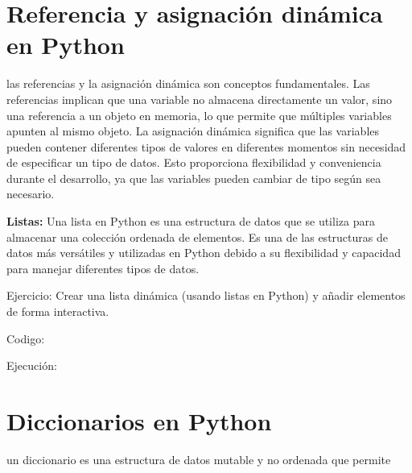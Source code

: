 \documentclass[a4paper]{article}
\begin{document}
\section{Referencia y asignación dinámica en Python}
{
las referencias y la asignación dinámica son conceptos fundamentales. Las referencias implican que una variable no
almacena directamente un valor, sino una referencia a un objeto en memoria, lo que permite que múltiples variables
apunten al mismo objeto. La asignación dinámica significa que las variables pueden contener diferentes tipos de valores
en diferentes momentos sin necesidad de especificar un tipo de datos. Esto proporciona flexibilidad y conveniencia
durante el desarrollo, ya que las variables pueden cambiar de tipo según sea necesario.}


\bigskip

{
\textbf{Listas: }Una lista en Python es una estructura de datos que se utiliza para almacenar una colección ordenada de
elementos. Es una de las estructuras de datos más versátiles y utilizadas en Python debido a su flexibilidad y
capacidad para manejar diferentes tipos de datos.}


\bigskip

{
Ejercicio: Crear una lista dinámica (usando listas en Python) y añadir elementos de forma interactiva.}

\clearpage
\pagestyle{Convertedii}



{
Codigo:}


\bigskip

{
Ejecución:}

\begin{center}
\end{center}

\bigskip

\section{Diccionarios en Python}

\bigskip

{
un diccionario es una estructura de datos mutable y no ordenada que permite}
\end{document}
